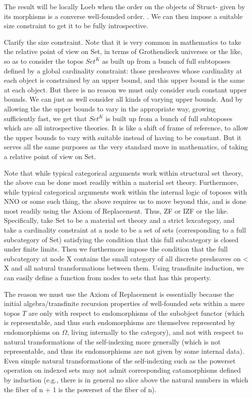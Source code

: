 The result will be locally Loeb when the order on the objects of Struct- given by its morphisms is a converse well-founded order. . We can then impose a suitable size constraint to get it to be fully introspective.

\begin{TODOblock}
Clarify the size constraint. Note that it is very common in mathematics to take the relative point of view on Set, in terms of Grothendieck universes or the like, so as to consider the topos $Set^K$ as built up from a bunch of full subtoposes defined by a global cardinality constraint: those presheaves whose cardinality at each object is constrained by an upper bound, and this upper bound is the same at each object. But there is no reason we must only consider such constant upper bounds. We can just as well consider all kinds of varying upper bounds. And by allowing the the upper bounds to vary in the appropriate way, growing sufficiently fast, we get that $Set^K$ is built up from a bunch of full subtoposes which are all introspective theories. It is like a shift of frame of reference, to allow the upper bounds to vary with suitable  instead of having to be constant. But it serves all the same purposes as the very standard move in mathematics, of taking a relative point of view on Set.

Note that while typical categorical arguments work within structural set theory, the above can be done most readily within a material set theory. Furthermore, while typical categorical arguments work within the internal logic of toposes with NNO or some such thing, the above requires us to move beyond this, and is done most readily using the Axiom of Replacement. Thus, ZF or IZF or the like. Specifically, take Set to be a material set theory and a strict lexcategory, and take a cardinality constraint at a node to be a set of sets (corresponding to a full subcategory of Set) satisfying the condition that this full subcategory is closed under finite limits. Then we furthermore impose the condition that the full subcategory at node X contains the small category of all discrete presheaves on < X and all natural transformations between them. Using transfinite induction, we can easily define a function from nodes to sets that has this property.

The reason we must use the Axiom of Replacement is essentially because the initial algebra/transfinite recursion properties of well-founded sets within a mere topos $T$ are only with respect to endomorphisms of the subobject functor (which is representable, and thus such endomorphisms are themselves represented by endomorphisms on $\Omega$, living internally to the category), and not with respect to natural transformations of the self-indexing more generally (which is not representable, and thus its endomorphisms are not given by some internal data). Even simple natural transformations of the self-indexing such as the powerset operation on indexed sets may not admit corresponding catamorphisms defined by induction (e.g., there is in general no slice above the natural numbers in which the fiber of n + 1 is the powerset of the fiber of n).
\end{TODOblock}

